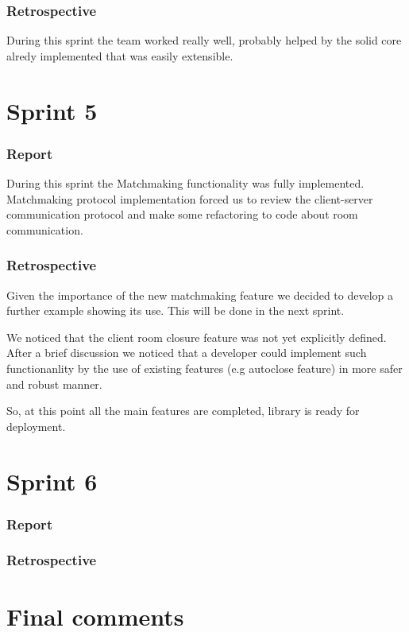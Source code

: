 \subsubsection{Retrospective}

During this sprint the team worked really well, probably helped by the solid core alredy implemented that was easily extensible.





\section{Sprint 5}

\subsubsection{Report}
During this sprint the Matchmaking functionality was fully implemented. 
Matchmaking protocol implementation forced us to review the client-server communication protocol and make some refactoring to code about room communication.

\subsubsection{Retrospective}

Given the importance of the new matchmaking feature we decided to develop a further example showing its use. This will be done in the next sprint.

We noticed that the client room closure feature was not yet explicitly defined. 
After a brief discussion we noticed that a developer could implement such functionanlity by the use of existing features (e.g autoclose feature) in more safer and robust manner.

So, at this point all the main features are completed, library is ready for deployment.


\section{Sprint 6}

\subsubsection{Report}

\subsubsection{Retrospective}


\section{Final comments}